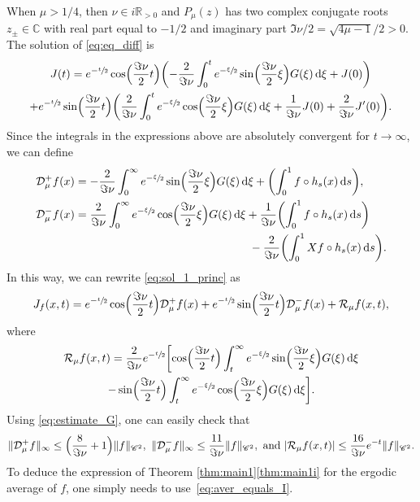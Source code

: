 \documentclass[JEP,XML,SOM,NoEqCountersInSection,Unicode,published]{cedram}
\newcommand \R{\mathbb{R}}
\newcommand*{\diff}{\mathop{}\!\mathrm{d}}
\newcommand{\Dp}[1]{\mathcal{D}_\mu^{+} #1}
\newcommand{\Dm}[1]{\mathcal{D}_\mu^{-} #1}
\theoremstyle{definition}
\begin{document}
When $\mu > 1/4$, then $\nu \in i \R_{>0}$ and $P_\mu(z)$ has two complex conjugate roots $z_{\pm} \in \mathbb{C}$ with real part equal to $-1/2$ and imaginary part $\Im \nu / 2 = \sqrt{4 \mu -1} / 2 >0$.
The solution of \eqref{eq:eq_diff} is
\begin{multline}\label{eq:sol_1_princ}
J(t) = e^{-\sfrac{t}{2}} \cos\Bigl(\frac{\Im\nu}{2}t \Bigr) \biggl(- \frac{2}{\Im\nu} \int_0^t e^{-\sfrac{\xi}{2}} \sin\Bigl(\frac{\Im \nu}{2}\xi \Bigr)G(\xi) \diff \xi + J(0) \biggr) \\
+e^{-\sfrac{t}{2}} \sin\Bigl(\frac{\Im\nu}{2}t \Bigr) \biggl(\frac{2}{\Im\nu} \int_0^t e^{-\sfrac{\xi}{2}} \cos\Bigl(\frac{\Im\nu}{2}\xi \Bigr)G(\xi) \diff \xi + \frac{1}{\Im\nu} J(0) + \frac{2}{\Im\nu}J'(0) \biggr).
\end{multline}
Since the integrals in the expressions above are absolutely convergent for $t \to \infty$, we can define
\begin{equation*}
\begin{split}
\Dp{f}(x) &= - \frac{2}{\Im\nu} \int_0^\infty e^{-\sfrac{\xi}{2}} \sin\Bigl(\frac{\Im\nu}{2}\xi \Bigr)G(\xi) \diff \xi + \biggl(\int_0^1 f \circ h_s(x) \diff s \biggr),\\
\Dm{f}(x) &= \frac{2}{\Im\nu} \int_0^\infty e^{-\sfrac{\xi}{2}} \cos\Bigl(\frac{\Im\nu}{2}\xi \Bigr)G(\xi) \diff \xi + \frac{1}{\Im\nu} \biggl(\int_0^1 f \circ h_s(x) \diff s \biggr) \\
& \hspace*{5.4cm}- \frac{2}{\Im\nu}\biggl(\int_0^1 Xf \circ h_s(x) \diff s \biggr).
\end{split}
\end{equation*}
In this way, we can rewrite \eqref{eq:sol_1_princ} as
\begin{equation}\label{eq:I_mu_princ}
J_{f}(x,t) = e^{-\sfrac{t}{2}} \cos\Bigl(\frac{\Im\nu}{2}t \Bigr) \Dp{f}(x) + e^{-\sfrac{t}{2}} \sin\Bigl(\frac{\Im\nu}{2}t \Bigr) \Dm{f}(x) + \mathcal{R}_{\mu}f(x,t),
\end{equation}
where
\begin{multline*}
\mathcal{R}_{\mu}f(x,t) = \frac{2}{\Im\nu} e^{-\sfrac{t}{2}} \biggl[\cos\Bigl(\frac{\Im\nu}{2}t \Bigr) \int_t^\infty e^{-\sfrac{\xi}{2}} \sin\Bigl(\frac{\Im\nu}{2}\xi \Bigr)G(\xi) \diff \xi \\
- \sin\Bigl(\frac{\Im\nu}{2}t \Bigr) \int_t^\infty e^{-\sfrac{\xi}{2}} \cos\Bigl(\frac{\Im\nu}{2}\xi \Bigr)G(\xi) \diff \xi \biggr].
\end{multline*}
Using \eqref{eq:estimate_G}, one can easily check that
\begin{equation*}
\|\Dp{f}\|_{\infty} \leq \Bigl(\frac{8}{\Im\nu} +1 \Bigr) \|f\|_{\mathscr{C}^2}, \ \|\Dm{f}\|_{\infty} \leq \frac{11}{\Im\nu} \|f\|_{\mathscr{C}^2}, \ \text{and}\ |\mathcal{R}_\mu f(x,t) |\leq \frac{16}{\Im\nu} e^{-t}\|f\|_{\mathscr{C}^2}.
\end{equation*}
To deduce the expression of Theorem \ref{thm:main1}\eqref{thm:main1i} for the ergodic average of $f$, one simply needs to use~\eqref{eq:aver_equals_I}.
\end{document}
